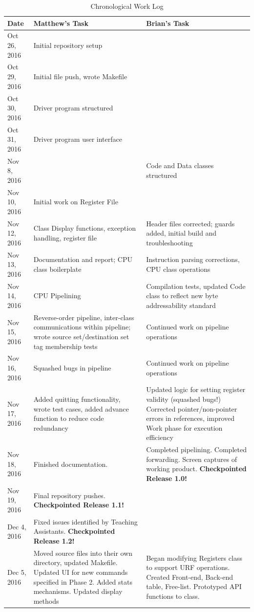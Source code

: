 \documentclass[12pt]{article}
\begin{document}
\begin{table}
  \centering
  \caption{Chronological Work Log}
  \label{tab:worklog}
  \begin{tabular}{l|p{2.75in}|p{2.75in}}
  Date         & Matthew's Task & Brian's Task \\
  \hline
	Oct 26, 2016 & Initial repository setup 				& \\
	Oct 29, 2016 & Initial file push, wrote Makefile 	& \\
	Oct 30, 2016 & Driver program structured 			& \\
	Oct 31, 2016 & Driver program user interface			&  \\
	Nov 8, 2016  & 										& Code and Data classes structured \\
	Nov 10, 2016 & Initial work on Register File			& \\
	Nov 12, 2016 & Class Display functions,
	exception handling, register file 					& Header files corrected; guards added, initial build and troubleshooting \\
	Nov 13, 2016 & Documentation and report; CPU class boilerplate & Instruction parsing corrections, CPU class operations \\
	Nov 14, 2016 & CPU Pipelining & Compilation tests, updated Code class to reflect new byte addressability standard \\
	Nov 15, 2016 & Reverse-order pipeline, inter-class communications within pipeline; wrote source set/destination set tag membership tests & Continued work on pipeline operations \\
	Nov 16, 2016 & Squashed bugs in pipeline & Continued work on pipeline operations \\
	Nov 17, 2016 & Added quitting functionality, wrote test cases, added advance function to reduce code redundancy & Updated logic for setting register validity (squashed bugs!) Corrected pointer/non-pointer errors in references, improved Work phase for execution efficiency \\
	Nov 18, 2016 & Finished documentation. & Completed pipelining. Completed forwarding. Screen captures of working product. \textbf{Checkpointed Release 1.0!} \\
	Nov 19, 2016 & Final repository pushes. \textbf{Checkpointed Release 1.1!} & \\
	\hline
	Dec 4, 2016  & Fixed issues identified by Teaching Assistants. \textbf{Checkpointed Release 1.2!} &  \\
	Dec 5, 2016  & Moved source files into their own directory, updated Makefile. Updated UI for new commands specified in Phase 2. Added stats mechanisms. Updated display methods & Began modifying Registers class to support URF operations. Created Front-end, Back-end table, Free-list. Prototyped API functions to class.\\
  \end{tabular}
\end{table}
\end{document}
